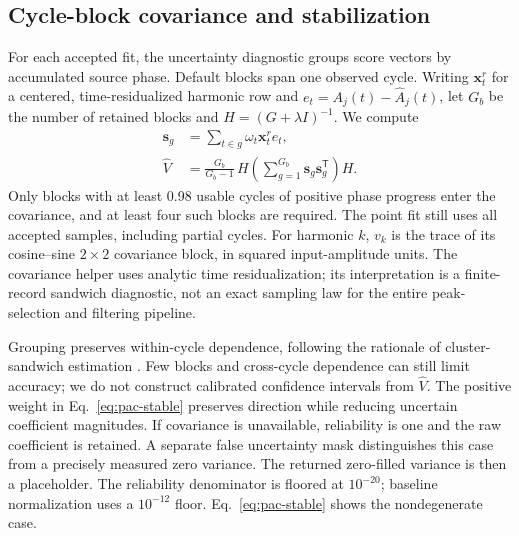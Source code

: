\documentclass[10pt,twocolumn,letterpaper]{article}
\begin{document}
\subsection{Cycle-block covariance and stabilization}
\label{app:operator-uncertainty}
For each accepted fit, the uncertainty diagnostic groups score vectors
by accumulated source phase. Default blocks span one observed cycle.
Writing $\mathbf x_t^r$ for a centered, time-residualized harmonic
row and $e_t=A_j(t)-\widehat A_j(t)$, let $G_b$ be the number of
retained blocks and $H=(G+\lambda I)^{-1}$. We compute
\begin{equation}
\begin{aligned}
\mathbf s_g&=\sum_{t\in g}\omega_t\mathbf x_t^r e_t,\\
\widehat V&=\frac{G_b}{G_b-1}\,
 H\left(\sum_{g=1}^{G_b}\mathbf s_g\mathbf s_g^{\mathsf T}\right)H.
\end{aligned}
\label{eq:cycle-covariance}
\end{equation}
Only blocks with at least 0.98 usable cycles of positive phase progress
enter the covariance, and at least four such blocks are required.
The point fit still uses all accepted samples, including partial cycles.
For harmonic $k$, $v_k$ is the trace of its cosine--sine $2\times2$
covariance block, in squared input-amplitude units. The covariance
helper uses analytic time residualization; its interpretation is a
finite-record sandwich diagnostic, not an exact sampling law for the
entire peak-selection and filtering pipeline.

Grouping preserves within-cycle dependence, following the rationale of
cluster-sandwich estimation \citep{cameron2015cluster}. Few blocks and
cross-cycle dependence can still limit accuracy; we do not construct
calibrated confidence intervals from $\widehat V$. The positive weight
in Eq.~\ref{eq:pac-stable} preserves direction while reducing uncertain
coefficient magnitudes. If covariance is unavailable, reliability is
one and the raw coefficient is retained. A separate false uncertainty
mask distinguishes this case from a precisely measured zero variance.
The returned zero-filled variance is then a placeholder. The reliability
denominator is floored at $10^{-20}$; baseline normalization uses a
$10^{-12}$ floor. Eq.~\ref{eq:pac-stable} shows the nondegenerate case.
\end{document}
